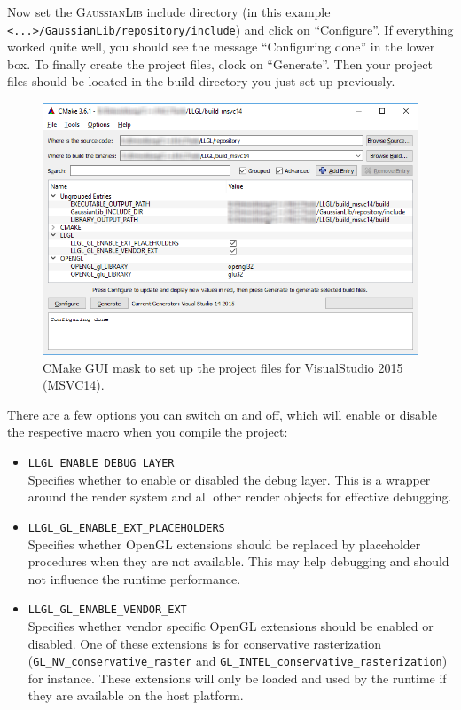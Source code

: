 \documentclass{article}
\begin{document}
Now set the \textsc{GaussianLib} include directory (in this example \texttt{<...>/GaussianLib/repository/include})
and click on ``Configure''. If everything worked quite well, you should see the message ``Configuring done''
in the lower box. To finally create the project files, clock on ``Generate''.
Then your project files should be located in the build directory you just set up previously.

\begin{figure}[H]
	\centering
	\includegraphics[width=0.9 \textwidth]{cmake_mask1}
	\caption{CMake GUI mask to set up the project files for VisualStudio 2015 (MSVC14).}
	\label{fig:cmake_mask1}
\end{figure}

There are a few options you can switch on and off, which will enable or disable the respective macro
when you compile the project:
\begin{itemize}
	\item \texttt{LLGL\_ENABLE\_DEBUG\_LAYER} \\
	Specifies whether to enable or disabled the debug layer.
	This is a wrapper around the render system and all other render objects for effective debugging.
	
	\item \texttt{LLGL\_GL\_ENABLE\_EXT\_PLACEHOLDERS} \\
	Specifies whether OpenGL extensions should be replaced by placeholder procedures
	when they are not available. This may help debugging and should not influence the runtime performance.
	
	\item \texttt{LLGL\_GL\_ENABLE\_VENDOR\_EXT} \\
	Specifies whether vendor specific OpenGL extensions should be enabled or disabled.
	One of these extensions is for conservative rasterization
	(\texttt{GL\_NV\_conservative\_raster} and \texttt{GL\_INTEL\_conservative\_rasterization}) for instance.
	These extensions will only be loaded and used by the runtime if they are available on the host platform.
\end{itemize}
\end{document}
